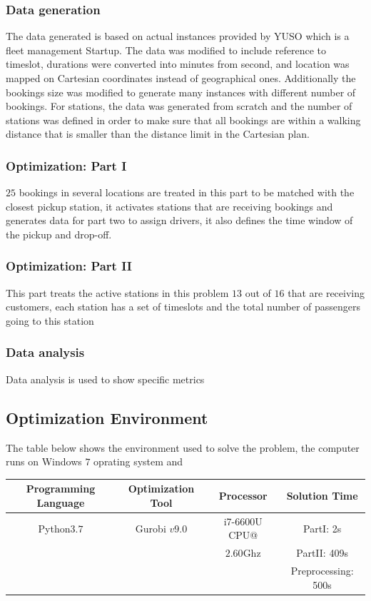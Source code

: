 \documentclass{article}
\begin{document}
\subsubsection*{Data generation}
The data generated is based on actual instances provided by YUSO which is a fleet management Startup. The data was modified to include reference to timeslot, durations were converted into minutes from second, and location was mapped on Cartesian coordinates instead of geographical ones. Additionally the bookings size was modified to generate many instances with different number of bookings.
For stations, the data was generated from scratch and the number of stations was defined in order to make sure that all bookings are within a walking distance that is smaller than the distance limit in the Cartesian plan. 

\subsubsection*{Optimization: Part I }
$25$ bookings in several locations are treated in this part to be matched with the closest pickup station, it activates stations that are receiving bookings and generates data for part two to assign drivers, it also defines the time window of the pickup and drop-off. 

\subsubsection*{Optimization: Part II}
This part treats the active stations in this problem $13$ out of $16$ that are receiving customers, each station has a set of timeslots and the total number of passengers going to this station

\subsubsection*{Data analysis}
Data analysis is used to show specific metrics 

\subsection{Optimization Environment}
\label{subsec:env_res}

The table below shows the environment used to solve the problem, the computer runs on Windows $7$ oprating system and 
\begin{center}
 \begin{tabular}{||c c c c||} 
 \hline
 \textbf{Programming Language} & \textbf{Optimization Tool} & \textbf{Processor} & \textbf{Solution Time} \\ [0.5ex] 
 \hline\hline
 Python$3.7$ & Gurobi $v9.0$ & i7-6600U CPU@  & PartI: 2s \\ 
 \hline
 &  & $2.60$Ghz & PartII: 409s  \\
 \hline
  &  &  & Preprocessing: 500s  \\
 \hline
\end{tabular}
\end{center}
\end{document}

